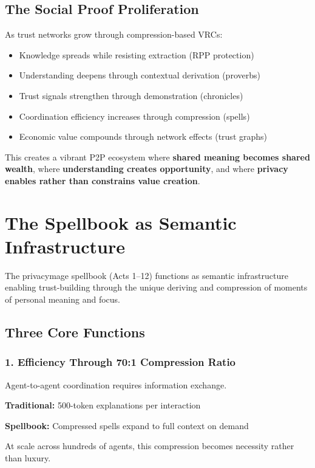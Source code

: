 \documentclass[11pt,a4paper]{article}
\theoremstyle{definition}
\begin{document}
\subsection{The Social Proof Proliferation}

As trust networks grow through compression-based VRCs:

\begin{itemize}
    \item Knowledge spreads while resisting extraction (RPP protection)
    \item Understanding deepens through contextual derivation (proverbs)
    \item Trust signals strengthen through demonstration (chronicles)
    \item Coordination efficiency increases through compression (spells)
    \item Economic value compounds through network effects (trust graphs)
\end{itemize}

This creates a vibrant P2P ecosystem where \textbf{shared meaning becomes shared wealth}, where \textbf{understanding creates opportunity}, and where \textbf{privacy enables rather than constrains value creation}.

\section{The Spellbook as Semantic Infrastructure}

The privacymage spellbook (Acts 1--12) functions as semantic infrastructure enabling trust-building through the unique deriving and compression of moments of personal meaning and focus.

\subsection{Three Core Functions}

\subsubsection{1. Efficiency Through 70:1 Compression Ratio}

Agent-to-agent coordination requires information exchange.

\textbf{Traditional:} 500-token explanations per interaction

\textbf{Spellbook:} Compressed spells expand to full context on demand

At scale across hundreds of agents, this compression becomes necessity rather than luxury.
\end{document}
